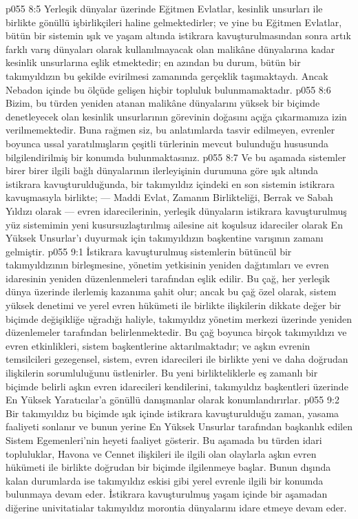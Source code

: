 \vs p055 8:5 Yerleşik dünyalar üzerinde Eğitmen Evlatlar, kesinlik unsurları ile birlikte gönüllü işbirlikçileri haline gelmektedirler; ve yine bu Eğitmen Evlatlar, bütün bir sistemin ışık ve yaşam altında istikrara kavuşturulmasından sonra artık farklı varış dünyaları olarak kullanılmayacak olan malikâne dünyalarına kadar kesinlik unsurlarına eşlik etmektedir; en azından bu durum, bütün bir takımyıldızın bu şekilde evirilmesi zamanında gerçeklik taşımaktaydı. Ancak Nebadon içinde bu ölçüde gelişen hiçbir topluluk bulunmamaktadır.
\vs p055 8:6 Bizim, bu türden yeniden atanan malikâne dünyalarını yüksek bir biçimde denetleyecek olan kesinlik unsurlarının görevinin doğasını açığa çıkarmamıza izin verilmemektedir. Buna rağmen siz, bu anlatımlarda tasvir edilmeyen, evrenler boyunca ussal yaratılmışların çeşitli türlerinin mevcut bulunduğu hususunda bilgilendirilmiş bir konumda bulunmaktasınız.
\vs p055 8:7 Ve bu aşamada sistemler birer birer ilgili bağlı dünyalarının ilerleyişinin durumuna göre ışık altında istikrara kavuşturulduğunda, bir takımyıldız içindeki en son sistemin istikrara kavuşmasıyla birlikte; --- Maddi Evlat, Zamanın Birlikteliği, Berrak ve Sabah Yıldızı olarak --- evren idarecilerinin, yerleşik dünyaların istikrara kavuşturulmuş yüz sistemimin yeni kusursuzlaştırılmış ailesine ait koşulsuz idareciler olarak En Yüksek Unsurlar’ı duyurmak için takımyıldızın başkentine varışının zamanı gelmiştir.
\vs p055 9:1 İstikrara kavuşturulmuş sistemlerin bütüncül bir takımyıldızının birleşmesine, yönetim yetkisinin yeniden dağıtımları ve evren idaresinin yeniden düzenlenmeleri tarafından eşlik edilir. Bu çağ, her yerleşik dünya üzerinde ilerlemiş kazanıma şahit olur; ancak bu çağ özel olarak, sistem yüksek denetimi ve yerel evren hükümeti ile birlikte ilişkilerin dikkate değer bir biçimde değişikliğe uğradığı haliyle, takımyıldız yönetim merkezi üzerinde yeniden düzenlemeler tarafından belirlenmektedir. Bu çağ boyunca birçok takımyıldızı ve evren etkinlikleri, sistem başkentlerine aktarılmaktadır; ve aşkın evrenin temsilcileri gezegensel, sistem, evren idarecileri ile birlikte yeni ve daha doğrudan ilişkilerin sorumluluğunu üstlenirler. Bu yeni birlikteliklerle eş zamanlı bir biçimde belirli aşkın evren idarecileri kendilerini, takımyıldız başkentleri üzerinde En Yüksek Yaratıcılar’a gönüllü danışmanlar olarak konumlandırırlar.
\vs p055 9:2 Bir takımyıldız bu biçimde ışık içinde istikrara kavuşturulduğu zaman, yasama faaliyeti sonlanır ve bunun yerine En Yüksek Unsurlar tarafından başkanlık edilen Sistem Egemenleri’nin heyeti faaliyet gösterir. Bu aşamada bu türden idari topluluklar, Havona ve Cennet ilişkileri ile ilgili olan olaylarla aşkın evren hükümeti ile birlikte doğrudan bir biçimde ilgilenmeye başlar. Bunun dışında kalan durumlarda ise takımyıldız eskisi gibi yerel evrenle ilgili bir konumda bulunmaya devam eder. İstikrara kavuşturulmuş yaşam içinde bir aşamadan diğerine univitatialar takımyıldız morontia dünyalarını idare etmeye devam eder.
